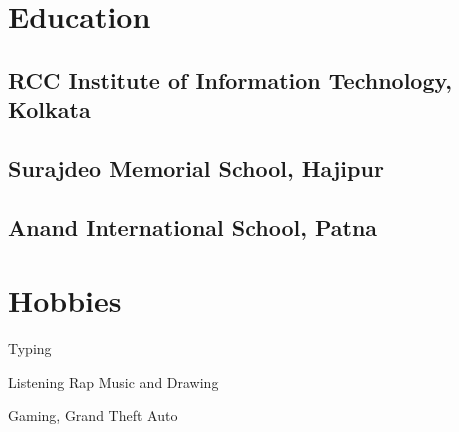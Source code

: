 \documentclass[letterpaper]{deedy-resume}
\begin{document}
\begin{minipage}[t]{0.30\textwidth}


%
%


\section{Education} 

\subsection{RCC Institute of Information Technology, Kolkata}


\sectionspace 

\subsection{Surajdeo Memorial School, Hajipur}
\sectionspace 


\subsection{Anand International School, Patna}
\sectionspace 

\section{Hobbies}
\vspace{\topsep} %
\begin{tightitemize}
\item Typing
\item Listening Rap Music and Drawing
\item Gaming, Grand Theft Auto
\end{tightitemize}
\sectionspace 


\end{minipage}
\end{document}
